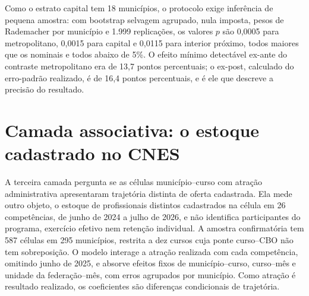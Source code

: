 \documentclass[11pt,a4paper]{article}
\begin{document}
Como o estrato capital tem 18 municípios, o protocolo exige inferência de
pequena amostra: com bootstrap selvagem agrupado, nula imposta, pesos de
Rademacher por município e 1.999 replicações, os valores $p$ são 0,0005 para
metropolitano, 0,0015 para capital e 0,0115 para interior próximo, todos
maiores que os nominais e todos abaixo de 5\%. O efeito mínimo detectável
ex-ante do contraste metropolitano era de 13,7 pontos percentuais; o ex-post,
calculado do erro-padrão realizado, é de 16,4 pontos percentuais, e é ele que
descreve a precisão do resultado.

\section{Camada associativa: o estoque cadastrado no CNES}
\label{sec:cnes}

A terceira camada pergunta se as células município--curso com atração
administrativa apresentaram trajetória distinta de oferta cadastrada. Ela mede
outro objeto, o estoque de profissionais distintos cadastrados na célula em 26
competências, de junho de 2024 a julho de 2026, e não identifica participantes
do programa, exercício efetivo nem retenção individual. A amostra confirmatória
tem 587 células em 295 municípios, restrita a dez cursos cuja ponte curso--CBO
não tem sobreposição. O modelo interage a atração realizada com cada
competência, omitindo junho de 2025, e absorve efeitos fixos de
município--curso, curso--mês e unidade da federação--mês, com erros agrupados
por município. Como atração é resultado realizado, os coeficientes são
diferenças condicionais de trajetória.
\end{document}
